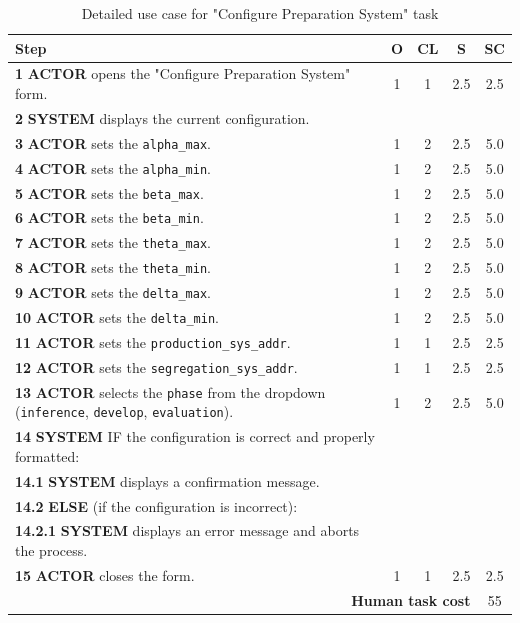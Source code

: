 \begin{table}[H]
    \centering
    \begin{tabularx}{\textwidth}{|X|c|c|c|c|}
    \hline
    \textbf{Step} & \textbf{O} & \textbf{CL} & \textbf{S} & \textbf{SC} \\
    \hline
    \textbf{1} \textbf{ACTOR} opens the "Configure Preparation System" form. & 1 & 1 & 2.5 & 2.5 \\
    \hline
    \textbf{2} \textbf{SYSTEM} displays the current configuration. &  &  &  &  \\
    \hline
    \textbf{3} \textbf{ACTOR} sets the \texttt{alpha\_max}. & 1 & 2 & 2.5 & 5.0 \\
    \hline
    \textbf{4} \textbf{ACTOR} sets the \texttt{alpha\_min}. & 1 & 2 & 2.5 & 5.0 \\
    \hline
    \textbf{5} \textbf{ACTOR} sets the \texttt{beta\_max}. & 1 & 2 & 2.5 & 5.0 \\
    \hline
    \textbf{6} \textbf{ACTOR} sets the \texttt{beta\_min}. & 1 & 2 & 2.5 & 5.0 \\
    \hline
    \textbf{7} \textbf{ACTOR} sets the \texttt{theta\_max}. & 1 & 2 & 2.5 & 5.0 \\
    \hline
    \textbf{8} \textbf{ACTOR} sets the \texttt{theta\_min}. & 1 & 2 & 2.5 & 5.0 \\
    \hline
    \textbf{9} \textbf{ACTOR} sets the \texttt{delta\_max}. & 1 & 2 & 2.5 & 5.0 \\
    \hline
    \textbf{10} \textbf{ACTOR} sets the \texttt{delta\_min}. & 1 & 2 & 2.5 & 5.0 \\
    \hline
    \textbf{11} \textbf{ACTOR} sets the \texttt{production\_sys\_addr}. & 1 & 1 & 2.5 & 2.5 \\
    \hline
    \textbf{12} \textbf{ACTOR} sets the \texttt{segregation\_sys\_addr}. & 1 & 1 & 2.5 & 2.5 \\
    \hline
    \textbf{13} \textbf{ACTOR} selects the \texttt{phase} from the dropdown (\texttt{inference}, \texttt{develop}, \texttt{evaluation}). & 1 & 2 & 2.5 & 5.0 \\
    \hline
    \textbf{14} \textbf{SYSTEM} {IF} the configuration is correct and properly formatted: &  &  &  &  \\
    \hline
    \textbf{14.1} \textbf{SYSTEM} displays a confirmation message. & & & &  \\
    \hline
    \textbf{14.2} \textbf{ELSE} (if the configuration is incorrect): & & &  &  \\
    \hline
    \textbf{14.2.1} \textbf{SYSTEM} displays an error message and aborts the process. &  &  &  &  \\
    \hline
    \textbf{15} \textbf{ACTOR} closes the form. & 1 & 1 & 2.5 & 2.5 \\
    \hline
    \multicolumn{4}{|r|}{\textbf{Human task cost}} & 55 \\
    \hline
    \end{tabularx}
    \caption{Detailed use case for "Configure Preparation System" task}
    \label{table:configure_preparation_system}
    \end{table}
